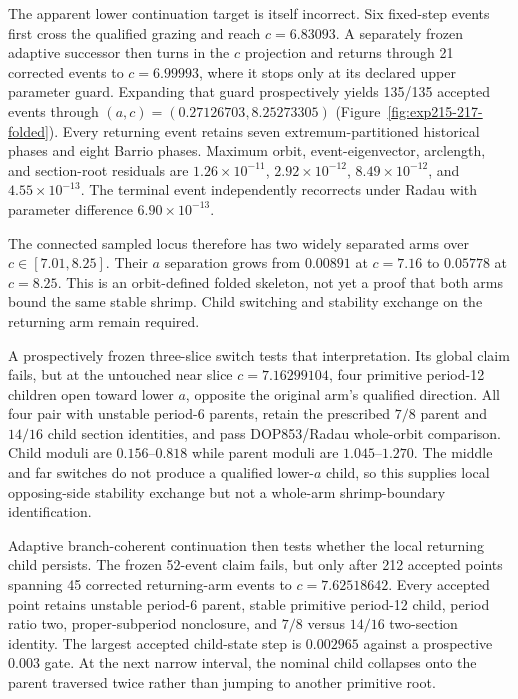 The apparent lower continuation target is itself incorrect.  Six fixed-step
events first cross the qualified grazing and reach $c=6.83093$.  A separately
frozen adaptive successor then turns in the $c$ projection and returns through
21 corrected events to $c=6.99993$, where it stops only at its declared upper
parameter guard.  Expanding that guard prospectively yields 135/135 accepted
events through $(a,c)=(0.27126703,8.25273305)$
(Figure~\ref{fig:exp215-217-folded}).  Every returning event retains seven
extremum-partitioned historical phases and eight Barrio phases.  Maximum orbit,
event-eigenvector, arclength, and section-root residuals are
$1.26\times10^{-11}$, $2.92\times10^{-12}$, $8.49\times10^{-12}$, and
$4.55\times10^{-13}$.  The terminal event independently recorrects under
Radau with parameter difference $6.90\times10^{-13}$.

The connected sampled locus therefore has two widely separated arms over
$c\in[7.01,8.25]$.  Their $a$ separation grows from $0.00891$ at $c=7.16$ to
$0.05778$ at $c=8.25$.  This is an orbit-defined folded skeleton, not yet a
proof that both arms bound the same stable shrimp.  Child switching and
stability exchange on the returning arm remain required.

A prospectively frozen three-slice switch tests that interpretation.  Its
global claim fails, but at the untouched near slice $c=7.16299104$, four
primitive period-12 children open toward lower $a$, opposite the original
arm's qualified direction.  All four pair with unstable period-6 parents,
retain the prescribed $7/8$ parent and $14/16$ child section identities, and pass
DOP853/Radau whole-orbit comparison.  Child moduli are $0.156$--$0.818$ while
parent moduli are $1.045$--$1.270$.  The middle and far switches do not produce
a qualified lower-$a$ child, so this supplies local opposing-side stability
exchange but not a whole-arm shrimp-boundary identification.



Adaptive branch-coherent continuation then tests whether the local returning
child persists.  The frozen 52-event claim fails, but only after 212 accepted
points spanning 45 corrected returning-arm events to $c=7.62518642$. Every
accepted point retains unstable period-6 parent, stable primitive period-12
child, period ratio two, proper-subperiod nonclosure, and $7/8$ versus $14/16$
two-section identity.  The largest accepted child-state step is $0.002965$
against a prospective $0.003$ gate.  At the next narrow interval, the nominal
child collapses onto the parent traversed twice rather than jumping to another
primitive root.

